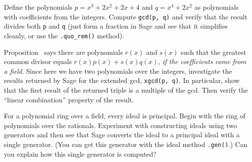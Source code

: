 %
%
Define the polynomials $p = x^3 + 2x^2 + 2x + 4$ and $q = x^4 + 2x^2$ as polynomials with coefficients from the integers.  Compute \verb?gcd(p, q)? and verify that the result divides both \verb?p? and \verb?q? (just form a fraction in Sage and see that it simplifies cleanly, or use the \verb?.quo_rem()? method).\par
%
Proposition~ says there are polynomials $r(x)$ and $s(x)$ such that the greatest common divisor equals $r(x)p(x)+s(x)q(x)$, \emph{if the coefficients come from a field}.  Since here we have two polynomials over the integers, investigate the results returned by Sage for the extended gcd, \verb?xgcd(p, q)?.  In particular, show that the first result of the returned triple is a multiple of the gcd.  Then verify the ``linear combination'' property of the result.
\begin{sageverbatim}\end{sageverbatim}
%
%
For a polynomial ring over a field, every ideal is principal.  Begin with the ring of polynomials over the rationals.  Experiment with constructing ideals using two generators and then see that Sage converts the ideal to a principal ideal with a single generator.  (You can get this generator with the ideal method \verb?.gen()?.)  Can you explain how this single generator is computed?
\begin{sageverbatim}\end{sageverbatim}
